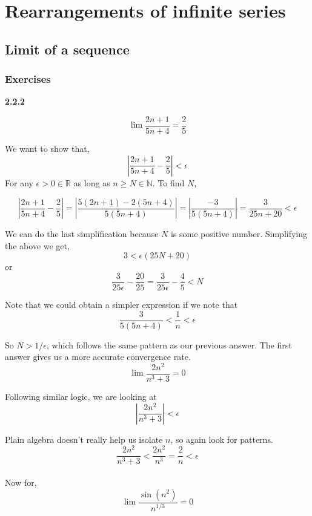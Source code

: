 
\section{Rearrangements of infinite series}


\subsection{Limit of a sequence}



\subsubsection{Exercises}

\textbf{2.2.2}

$$
\lim \frac{2n+1}{5n+4} = \frac{2}{5}
$$

We want to show that,
$$
\left| \frac{2n+1}{5n+4} - \frac{2}{5} \right| < \epsilon
$$
For any $\epsilon > 0 \in \mathbb{R}$ as long as $n \geq N \in \mathbb{N}$.
To find $N$,

$$
\left| \frac{2n+1}{5n+4} - \frac{2}{5} \right| =
\left| \frac{5(2n+1) - 2(5n+4)}{5(5n+4)}  \right| =
\left| \frac{-3}{5(5n+4)} \right| =
\frac{3}{25n+20} < \epsilon
$$

We can do the last simplification because $N$ is some positive number.
Simplifying the above we get,
$$
3 < \epsilon (25N + 20)
$$
or
$$
\frac{3}{25\epsilon} - \frac{20}{25} = \frac{3}{25\epsilon} - \frac{4}{5} < N
$$

Note that we could obtain a simpler expression if we note that
$$
\frac{3}{5(5n+4)} < \frac{1}{n} < \epsilon
$$

So $N > 1/\epsilon$, which follows the same pattern as our previous answer.
The first answer gives us a more accurate convergence rate.
\\

$$
\lim \frac{2n^2}{n^3 + 3} = 0
$$

Following similar logic, we are looking at
$$
\left| \frac{2n^2}{n^3 + 3} \right| < \epsilon
$$

Plain algebra doesn't really help us isolate $n$, so again look for patterns.
$$
\frac{2n^2}{n^3 + 3} < \frac{2n^2}{n^3} = \frac{2}{n} < \epsilon
$$
\\

Now for,
$$
\lim \frac{\sin (n^2)}{n^{1/3}} = 0
$$

